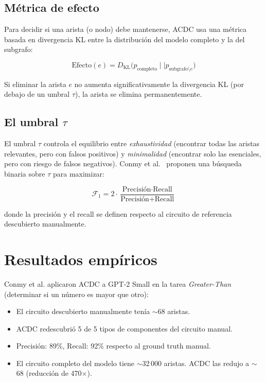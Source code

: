 \documentclass[11pt,a4paper]{report}
\theoremstyle{definition}
\begin{document}
\subsection{Métrica de efecto}

Para decidir si una arista (o nodo) debe mantenerse, ACDC usa una métrica basada en divergencia KL entre la distribución del modelo completo y la del subgrafo:

\[
\text{Efecto}(e) = D_{\text{KL}}\big(p_{\text{completo}} \mid\mid p_{\text{subgrafo} \setminus e}\big)
\]

Si eliminar la arista $e$ no aumenta significativamente la divergencia KL (por debajo de un umbral $\tau$), la arista se elimina permanentemente.

\subsection{El umbral $\tau$}

El umbral $\tau$ controla el equilibrio entre \emph{exhaustividad} (encontrar todas las aristas relevantes, pero con falsos positivos) y \emph{minimalidad} (encontrar solo las esenciales, pero con riesgo de falsos negativos). Conmy et al.~\cite{conmy2023acdc} proponen una búsqueda binaria sobre $\tau$ para maximizar:

\[
\mathcal{F}_1 = 2 \cdot \frac{\text{Precisión} \cdot \text{Recall}}{\text{Precisión} + \text{Recall}}
\]

donde la precisión y el recall se definen respecto al circuito de referencia descubierto manualmente.

\section{Resultados empíricos}

Conmy et al. aplicaron ACDC a GPT-2 Small en la tarea \emph{Greater-Than} (determinar si un número es mayor que otro):

\begin{itemize}
    \item El circuito descubierto manualmente tenía $\sim$68 aristas.
    \item ACDC redescubrió 5 de 5 tipos de componentes del circuito manual.
    \item Precisión: 89\%, Recall: 92\% respecto al ground truth manual.
    \item El circuito completo del modelo tiene $\sim$32\,000 aristas. ACDC las redujo a $\sim$68 (reducción de 470$\times$).
\end{itemize}
\end{document}
